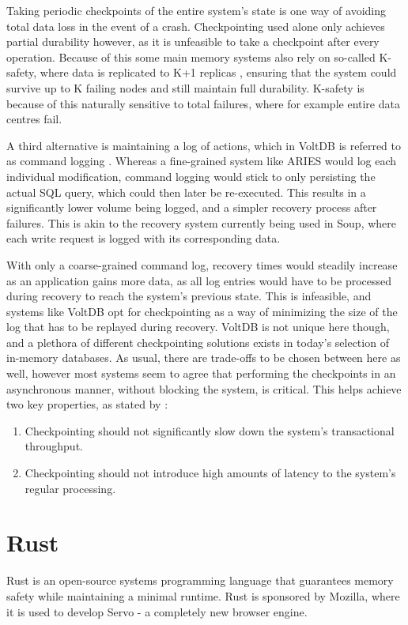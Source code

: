 \documentclass[b5paper]{report}
\begin{document}
Taking periodic checkpoints of the entire system's state is one way of avoiding
total data loss in the event of a crash. Checkpointing used alone only achieves
partial durability however, as it is unfeasible to take a checkpoint after every
operation. Because of this some main memory systems also rely on so-called
K-safety, where data is replicated to K+1 replicas \cite{early-voltdb},
ensuring that the system could survive up to K failing nodes and still maintain
full durability. K-safety is because of this naturally sensitive to total
failures, where for example entire data centres fail.

A third alternative is maintaining a log of actions, which in VoltDB is referred
to as command logging \cite{voltdb-recovery}. Whereas a fine-grained system like
ARIES would log each individual modification, command logging would stick to
only persisting the actual SQL query, which could then later be re-executed.
This results in a significantly lower volume being logged, and a simpler
recovery process after failures. This is akin to the recovery system currently
being used in Soup, where each write request is logged with its corresponding
data.

With only a coarse-grained command log, recovery times would steadily increase
as an application gains more data, as all log entries would have to be processed
during recovery to reach the system's previous state. This is infeasible, and
systems like VoltDB opt for checkpointing as a way of minimizing the size of the
log that has to be replayed during recovery. VoltDB is not unique here though, and
a plethora of different checkpointing solutions exists in today's selection of
in-memory databases. As usual, there are trade-offs to be chosen between here
as well, however most systems seem to agree that performing the checkpoints in
an asynchronous manner, without blocking the system, is critical. This helps
achieve two key properties, as stated by \cite{memory-checkpoint}:

\begin{enumerate}
  \item Checkpointing should not significantly slow down the system's
    transactional throughput.
  \item Checkpointing should not introduce high amounts of latency to the
    system's regular processing.
\end{enumerate}

\section{Rust}
Rust \cite{rust} is an open-source systems programming language that guarantees memory
safety while maintaining a minimal runtime. Rust is sponsored by Mozilla, where
it is used to develop Servo - a completely new browser engine.
\end{document}
